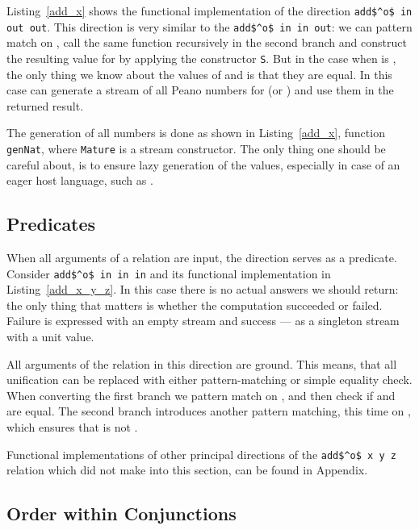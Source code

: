 Listing~\ref{add_x} shows the functional implementation of the direction \lstinline{add$^o$ in out out}.
This direction is very similar to the \lstinline{add$^o$ in in out}: we can pattern match on \x, call the same function recursively in the second \conde branch and construct the resulting value for \z by applying the constructor \lstinline{S}.
But in the case when \x is \zero, the only thing we know about the values of \y and \z is that they are equal.
In this case can generate a stream of all Peano numbers for \z (or \y) and use them in the returned result.

The generation of all numbers is done as shown in Listing~\ref{add_x}, function \lstinline{genNat}, where \lstinline{Mature} is a stream constructor.
The only thing one should be careful about, is to ensure lazy generation of the values, especially in case of an eager host language, such as \ocaml.



\subsection{Predicates}



When all arguments of a relation are input, the direction serves as a predicate.
Consider \lstinline{add$^o$ in in in} and its functional implementation in Listing~\ref{add_x_y_z}.
In this case there is no actual answers we should return: the only thing that matters is whether the computation succeeded or failed.
Failure is expressed with an empty stream and success --- as a singleton stream with a unit value.

All arguments of the relation in this direction are ground.
This means, that all unification can be replaced with either pattern-matching or simple equality check.
When converting the first \conde branch we pattern match on \x, and then check if \y and \z are equal.
The second \conde branch introduces another pattern matching, this time on \z, which ensures that \z is not \zero.

Functional implementations of other principal directions of the \lstinline{add$^o$ x y z} relation which did not make into this section, can be found in Appendix.





\subsection{Order within Conjunctions}

